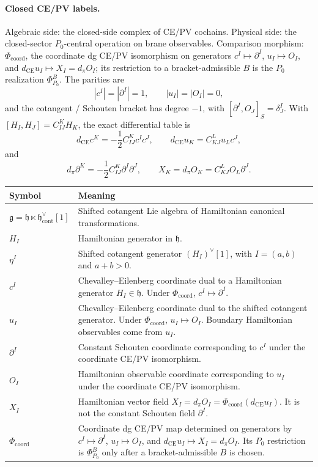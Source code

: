 \paragraph{Closed CE/PV labels.}
Algebraic side: the closed-side complex of CE/PV cochains.  Physical
side: the closed-sector \(P_0\)-central operation on brane
observables.  Comparison morphism: \(\Phi_{\mathrm{coord}}\), the
coordinate dg CE/PV isomorphism on generators
\(c^I\mapsto\partial^I\), \(u_I\mapsto O_I\), and
\(d_{\mathrm{CE}}u_I\mapsto X_I=d_\pi O_I\); its restriction to a
bracket-admissible \(B\) is the \(P_0\) realization \(\Phi^B_{P_0}\).
  The parities are
  \[
    |c^I|=|\partial^I|=1,\qquad |u_I|=|O_I|=0,
  \]
  and the cotangent / Schouten bracket has degree \(-1\), with
  \([\partial^I,O_J]_S=\delta^I_J\).
  With \([H_I,H_J]=C^K_{IJ}H_K\), the exact differential table is
  \[
    d_{\mathrm{CE}}c^K=-\frac12 C^K_{IJ}c^Ic^J,\qquad
    d_{\mathrm{CE}}u_K=C^L_{KJ}u_Lc^J,
  \]
  and
  \[
    d_\pi\partial^K=-\frac12 C^K_{IJ}\partial^I\partial^J,\qquad
    X_K=d_\pi O_K=C^L_{KJ}O_L\partial^J.
  \]
  \begin{center}
  \begin{tabular}{@{}>{\raggedright\arraybackslash}p{}
  >{\raggedright\arraybackslash}p{}@{}}
\hline
\textbf{Symbol} & \textbf{Meaning}\\
\hline
\(\mathfrak g=\mathfrak h\ltimes
\mathfrak h^\vee_{\mathrm{cont}}[1]\) &
Shifted cotangent Lie algebra of Hamiltonian canonical transformations.\\
\hline
\(H_I\) &
Hamiltonian generator in \(\mathfrak h\).\\
\hline
\(\eta^I\) &
Shifted cotangent generator \((H_I)^\vee[1]\), with \(I=(a,b)\) and
\(a+b>0\).\\
\hline
\(c^I\) &
Chevalley--Eilenberg coordinate dual to a Hamiltonian generator
\(H_I\in\mathfrak h\). Under \(\Phi_{\mathrm{coord}}\),
\(c^I\mapsto\partial^I\).\\
\hline
\(u_I\) &
Chevalley--Eilenberg coordinate dual to the shifted cotangent generator.
Under \(\Phi_{\mathrm{coord}}\), \(u_I\mapsto O_I\). Boundary Hamiltonian observables
come from \(u_I\).\\
\hline
\(\partial^I\) &
Constant Schouten coordinate corresponding to \(c^I\) under the
coordinate CE/PV isomorphism.\\
\hline
\(O_I\) &
Hamiltonian observable coordinate corresponding to \(u_I\) under the
coordinate CE/PV isomorphism.\\
\hline
\(X_I\) &
Hamiltonian vector field
\(X_I=d_\pi O_I=\Phi_{\mathrm{coord}}(d_{\mathrm{CE}}u_I)\).  It is
not the constant Schouten field \(\partial^I\).\\
\hline
\(\Phi_{\mathrm{coord}}\) &
Coordinate dg CE/PV map determined on generators by
\(c^I\mapsto\partial^I\), \(u_I\mapsto O_I\), and
\(d_{\mathrm{CE}}u_I\mapsto X_I=d_\pi O_I\).  Its \(P_0\)
restriction is \(\Phi^B_{P_0}\) only after a bracket-admissible \(B\)
is chosen.\\
\hline
\end{tabular}
\end{center}

